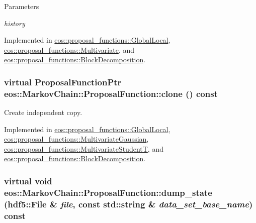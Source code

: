 \begin{DoxyParams}{Parameters}
\item[{\em history}]\end{DoxyParams}


Implemented in \hyperlink{classeos_1_1proposal__functions_1_1GlobalLocal_aecea521f102e4f3c2fd0fad24b21b730}{eos::proposal\_\-functions::GlobalLocal}, \hyperlink{classeos_1_1proposal__functions_1_1Multivariate_a03a15f539c8b7eeefb7e323d8c3cd15d}{eos::proposal\_\-functions::Multivariate}, and \hyperlink{classeos_1_1proposal__functions_1_1BlockDecomposition_a045b459bc8314548abe3e5766134e625}{eos::proposal\_\-functions::BlockDecomposition}.\hypertarget{structeos_1_1MarkovChain_1_1ProposalFunction_a7065079985f8bb44309d7773d85d225b}{
\subsubsection[{clone}]{\setlength{\rightskip}{0pt plus 5cm}virtual {\bf ProposalFunctionPtr} eos::MarkovChain::ProposalFunction::clone () const}}
\label{structeos_1_1MarkovChain_1_1ProposalFunction_a7065079985f8bb44309d7773d85d225b}


Create independent copy. 

Implemented in \hyperlink{classeos_1_1proposal__functions_1_1GlobalLocal_ae0ee0bd2127085ceacb1a89f5527515b}{eos::proposal\_\-functions::GlobalLocal}, \hyperlink{classeos_1_1proposal__functions_1_1MultivariateGaussian_abc989d0f246afe160eb1d4a0f1b4a03e}{eos::proposal\_\-functions::MultivariateGaussian}, \hyperlink{classeos_1_1proposal__functions_1_1MultivariateStudentT_a4f5007a73e656d9ff0476a4b5740018b}{eos::proposal\_\-functions::MultivariateStudentT}, and \hyperlink{classeos_1_1proposal__functions_1_1BlockDecomposition_ac863a3b2df66507f62c8decc7f543653}{eos::proposal\_\-functions::BlockDecomposition}.\hypertarget{structeos_1_1MarkovChain_1_1ProposalFunction_aea88a1340e10cc6a5b03d8b5483774f7}{
\subsubsection[{dump\_\-state}]{\setlength{\rightskip}{0pt plus 5cm}virtual void eos::MarkovChain::ProposalFunction::dump\_\-state ({\bf hdf5::File} \& {\em file}, \/  const std::string \& {\em data\_\-set\_\-base\_\-name}) const}}
\label{structeos_1_1MarkovChain_1_1ProposalFunction_aea88a1340e10cc6a5b03d8b5483774f7}


